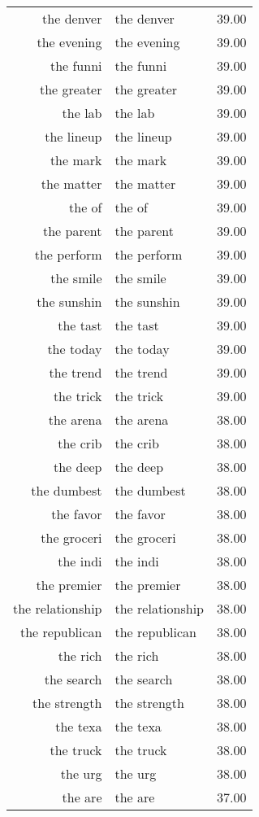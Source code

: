 \begin{table}[ht]
\begin{tabular}{rlr}
  the denver & the denver & 39.00 \\ 
  the evening & the evening & 39.00 \\ 
  the funni & the funni & 39.00 \\ 
  the greater & the greater & 39.00 \\ 
  the lab & the lab & 39.00 \\ 
  the lineup & the lineup & 39.00 \\ 
  the mark & the mark & 39.00 \\ 
  the matter & the matter & 39.00 \\ 
  the of & the of & 39.00 \\ 
  the parent & the parent & 39.00 \\ 
  the perform & the perform & 39.00 \\ 
  the smile & the smile & 39.00 \\ 
  the sunshin & the sunshin & 39.00 \\ 
  the tast & the tast & 39.00 \\ 
  the today & the today & 39.00 \\ 
  the trend & the trend & 39.00 \\ 
  the trick & the trick & 39.00 \\ 
  the arena & the arena & 38.00 \\ 
  the crib & the crib & 38.00 \\ 
  the deep & the deep & 38.00 \\ 
  the dumbest & the dumbest & 38.00 \\ 
  the favor & the favor & 38.00 \\ 
  the groceri & the groceri & 38.00 \\ 
  the indi & the indi & 38.00 \\ 
  the premier & the premier & 38.00 \\ 
  the relationship & the relationship & 38.00 \\ 
  the republican & the republican & 38.00 \\ 
  the rich & the rich & 38.00 \\ 
  the search & the search & 38.00 \\ 
  the strength & the strength & 38.00 \\ 
  the texa & the texa & 38.00 \\ 
  the truck & the truck & 38.00 \\ 
  the urg & the urg & 38.00 \\ 
  the are & the are & 37.00 \\ 

\end{tabular}
\end{table}
